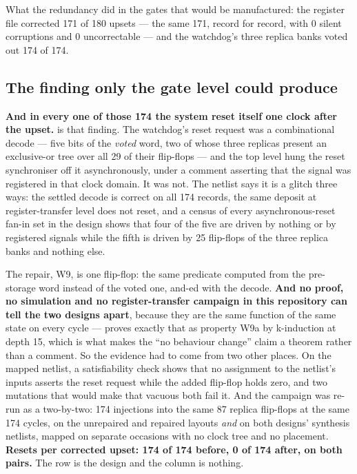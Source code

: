 What the redundancy did in the gates that would be manufactured: the
register file corrected 171 of 180 upsets --- the same 171, record for
record, with 0 silent corruptions and 0 uncorrectable --- and the
watchdog's three replica banks voted out 174 of 174.

\subsection{The finding only the gate level could produce}

\textbf{And in every one of those 174 the system reset itself one clock
after the upset.}  is that finding. The watchdog's reset
request was a combinational decode --- five bits of the \emph{voted}
word, two of whose three replicas present an exclusive-or tree over all
29 of their flip-flops --- and the top level hung the reset synchroniser
off it asynchronously, under a comment asserting that the signal was
registered in that clock domain. It was not. The netlist says it is a
glitch three ways: the settled decode is correct on all 174 records, the
same deposit at register-transfer level does not reset, and a census of
every asynchronous-reset fan-in set in the design shows that four of the
five are driven by nothing or by registered signals while the fifth is
driven by 25 flip-flops of the three replica banks and nothing else.

The repair, W9, is one flip-flop: the same predicate computed from the
pre-storage word instead of the voted one, and-ed with the decode.
\textbf{And no proof, no simulation and no register-transfer campaign in
this repository can tell the two designs apart}, because they are the
same function of the same state on every cycle --- 
proves exactly that as property W9a by k-induction at depth 15, which is
what makes the ``no behaviour change'' claim a theorem rather than a
comment. So the evidence had to come from two other places. On the mapped
netlist, a satisfiability check shows that no assignment to the netlist's
inputs asserts the reset request while the added flip-flop holds zero,
and two mutations that would make that vacuous both fail it. And the
campaign was re-run as a two-by-two: 174 injections into the same 87
replica flip-flops at the same 174 cycles, on the unrepaired and repaired
layouts \emph{and} on both designs' synthesis netlists, mapped on
separate occasions with no clock tree and no placement. \textbf{Resets
per corrected upset: 174 of 174 before, 0 of 174 after, on both pairs.}
The row is the design and the column is nothing.

